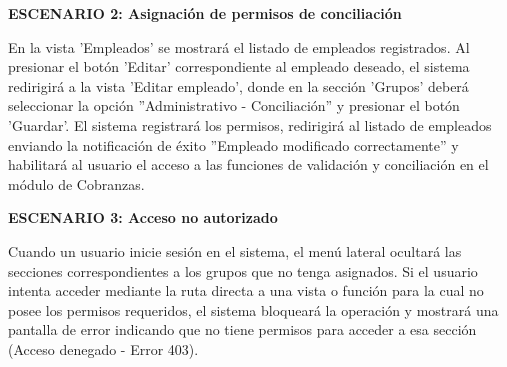 \documentclass[a4paper,9pt]{article}
\begin{document}
\begin{tcolorbox}[hucard, title={\textbf{HU-8: ASIGNAR PERMISOS ADMINISTRATIVOS} \hfill \scriptsize \colorbox{bluestatus}{\textbf{\ New\ }} \quad \colorbox{white}{\textcolor{primarydark}{\textbf{\ 3 pts\ }}}}]
{\noindent\textbf{\textcolor{secondarydark}{ESCENARIO 2:  Asignación de permisos de conciliación}}\par\vspace{1pt}
En la vista 'Empleados' se mostrará el listado de empleados registrados. Al presionar el botón 'Editar' correspondiente al empleado deseado, el sistema redirigirá a la vista 'Editar empleado', donde en la sección 'Grupos' deberá seleccionar la opción ''Administrativo - Conciliación'' y presionar el botón 'Guardar'. El sistema registrará los permisos, redirigirá al listado de empleados enviando la notificación de éxito ''Empleado modificado correctamente'' y habilitará al usuario el acceso a las funciones de validación y conciliación en el módulo de Cobranzas.\par\vspace{2.5pt}
\noindent\textbf{\textcolor{secondarydark}{ESCENARIO 3:  Acceso no autorizado}}\par\vspace{1pt}
Cuando un usuario inicie sesión en el sistema, el menú lateral ocultará las secciones correspondientes a los grupos que no tenga asignados. Si el usuario intenta acceder mediante la ruta directa a una vista o función para la cual no posee los permisos requeridos, el sistema bloqueará la operación y mostrará una pantalla de error indicando que no tiene permisos para acceder a esa sección (Acceso denegado - Error 403).\par\vspace{2.5pt}
}\par
\end{tcolorbox}
\end{document}
